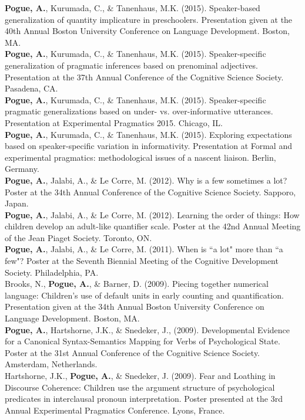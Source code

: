 \documentclass[margin, 7pt]{res} %
\begin{document}
\begin{resume}
{\bf Pogue, A.}, Kurumada, C., \& Tanenhaus, M.K. (2015). Speaker-based generalization of quantity implicature in preschoolers. Presentation given at the 40th Annual Boston University Conference on Language Development. Boston, MA. \medskip \\
{\bf Pogue, A.}, Kurumada, C., \& Tanenhaus, M.K. (2015). Speaker-specific generalization of pragmatic inferences based on prenominal adjectives. Presentation at the 37th Annual Conference of the Cognitive Science Society. Pasadena, CA. \medskip \\
{\bf Pogue, A.}, Kurumada, C., \& Tanenhaus, M.K. (2015). Speaker-specific pragmatic generalizations based on under- vs. over-informative utterances. Presentation at Experimental Pragmatics 2015. Chicago, IL. \medskip \\
{\bf Pogue, A.}, Kurumada, C., \& Tanenhaus, M.K. (2015). Exploring expectations based on speaker-specific variation in informativity. Presentation at Formal and experimental pragmatics: methodological issues of a nascent liaison. Berlin, Germany. \medskip \\
{\bf Pogue, A.}, Jalabi, A., \& Le Corre, M. (2012). Why is a few sometimes a lot? Poster at the 34th Annual Conference of the Cognitive Science Society. Sapporo, Japan. \medskip \\
{\bf Pogue, A.}, Jalabi, A., \& Le Corre, M. (2012). Learning the order of things: How children develop an adult-like quantifier scale. Poster at the 42nd Annual Meeting of the Jean Piaget Society. Toronto, ON. \medskip \\
{\bf Pogue, A.}, Jalabi, A., \& Le Corre, M. (2011). When is ``a lot" more than ``a few"? Poster at the Seventh Biennial Meeting of the Cognitive Development Society. Philadelphia, PA. \medskip \\
Brooks, N., {\bf Pogue, A.}, \& Barner, D. (2009). Piecing together numerical language: Children's use of default units in early counting and quantification. Presentation given at the 34th Annual Boston University Conference on Language Development. Boston, MA. \medskip \\
{\bf Pogue, A.}, Hartshorne, J.K., \& Snedeker, J., (2009). Developmental Evidence for a Canonical Syntax-Semantics Mapping for Verbs of Psychological State. Poster at the 31st Annual Conference of the Cognitive Science Society. Amsterdam, Netherlands. \medskip \\
Hartshorne, J.K., {\bf Pogue, A.}, \& Snedeker, J. (2009). Fear and Loathing in Discourse Coherence: Children use the argument structure of psychological predicates in interclausal pronoun interpretation. Poster presented at the 3rd Annual Experimental Pragmatics Conference. Lyons, France. \medskip \\

\end{resume}
\end{document}
